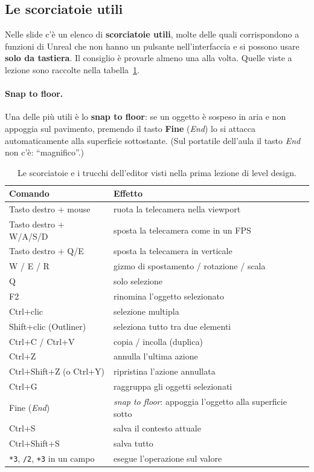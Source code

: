 \subsection{Le scorciatoie utili}

Nelle slide c'è un elenco di \textbf{scorciatoie utili}, molte delle quali
corrispondono a funzioni di Unreal che non hanno un pulsante nell'interfaccia e
si possono usare \textbf{solo da tastiera}. Il consiglio è provarle almeno una
alla volta. Quelle viste a lezione sono raccolte nella
tabella~\ref{gd8:tab:scorciatoie}.

\paragraph{Snap to floor.} Una delle più utili è lo \textbf{snap to floor}:
se un oggetto è sospeso in aria e non appoggia sul pavimento, premendo il
tasto \textbf{Fine} (\emph{End}) lo si attacca automaticamente alla superficie
sottostante. (Sul portatile dell'aula il tasto \emph{End} non c'è:
``magnifico''.)

\begin{table}[htbp]
\centering
\small
\begin{tabular}{@{}ll@{}}
\toprule
\textbf{Comando} & \textbf{Effetto} \\
\midrule
Tasto destro + mouse & ruota la telecamera nella viewport \\
Tasto destro + W/A/S/D & sposta la telecamera come in un FPS \\
Tasto destro + Q/E & sposta la telecamera in verticale \\
W / E / R & gizmo di spostamento / rotazione / scala \\
Q & solo selezione \\
F2 & rinomina l'oggetto selezionato \\
Ctrl+clic & selezione multipla \\
Shift+clic (Outliner) & seleziona tutto tra due elementi \\
Ctrl+C / Ctrl+V & copia / incolla (duplica) \\
Ctrl+Z & annulla l'ultima azione \\
Ctrl+Shift+Z (o Ctrl+Y) & ripristina l'azione annullata \\
Ctrl+G & raggruppa gli oggetti selezionati \\
Fine (\emph{End}) & \emph{snap to floor}: appoggia l'oggetto alla superficie sotto \\
Ctrl+S & salva il contesto attuale \\
Ctrl+Shift+S & salva tutto \\
\texttt{*3}, \texttt{/2}, \texttt{+3} in un campo & esegue l'operazione sul valore \\
\bottomrule
\end{tabular}
\caption{Le scorciatoie e i trucchi dell'editor visti nella prima lezione di
level design.}
\label{gd8:tab:scorciatoie}
\end{table}

